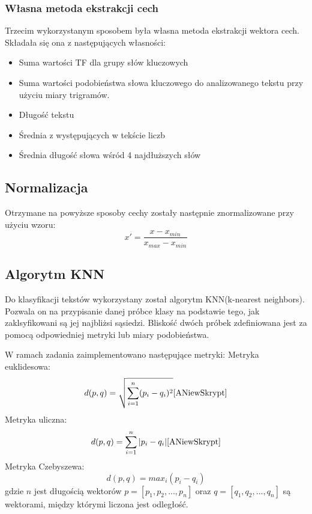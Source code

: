 \documentclass{classrep}
\begin{document}
\subsubsection{Własna metoda ekstrakcji cech}
Trzecim wykorzystanym sposobem była własna metoda ekstrakcji wektora cech. Składała się ona z następujących własności:
\begin{itemize}
	\item Suma wartości TF dla grupy słów kluczowych
	\item Suma wartości podobieństwa słowa kluczowego do analizowanego tekstu przy użyciu miary trigramów. \cite{ANiewSkrypt}
	\item Długość tekstu
	\item Średnia z występujących w tekście liczb
	\item Średnia długość słowa wśród 4 najdłuższych słów
\end{itemize}


\subsection{Normalizacja}
Otrzymane na powyższe sposoby cechy zostały następnie znormalizowane przy użyciu wzoru:
\begin{equation}
x' = \frac{x-x_{min}}{x_{max}-x_{min}}
\end{equation}

\subsection{Algorytm KNN}
Do klasyfikacji tekstów wykorzystany został algorytm KNN(k-nearest neighbors). Pozwala on na przypisanie danej próbce klasy na podstawie tego, jak zaklsyfikowani są jej najbliżsi sąsiedzi. Bliskość dwóch próbek zdefiniowana jest za pomocą odpowiedniej metryki lub miary podobieństwa. 

W ramach zadania zaimplementowano następujące metryki: \newline
Metryka euklidesowa:
\begin{equation}
d(p,q) = \sqrt{\sum_{i=1}^{n} (p_{i} -q_{i})^{2}} \cite{ANiewSkrypt}
\end{equation}
Metryka uliczna:
\begin{equation}
d(p,q) = \sum_{i=1}^{n} |p_{i} -q_{i}| \cite{ANiewSkrypt}
\end{equation}
Metryka Czebyszewa:
\begin{equation}
d(p,q) = max_{i}(p_{i} -q_{i})
\end{equation}
gdzie \(n\) jest długością wektorów \(p = [p_{1}, p_{2}, ..., p_{n}]\) oraz \(q = [q_{1}, q_{2}, ..., q_{n}]\) są wektorami, między którymi liczona jest odległość. 
\end{document}
